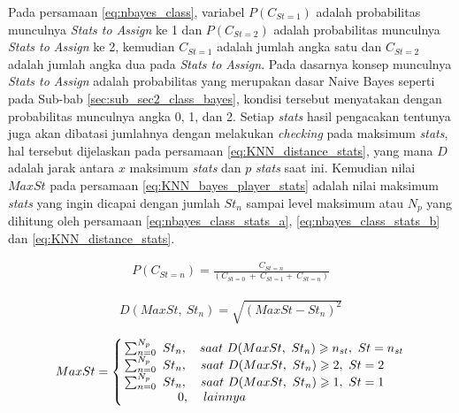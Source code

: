 Pada persamaan \ref{eq:nbayes_class}, variabel $P(C_{St = 1})$ adalah probabilitas munculnya \textit{Stats to Assign} ke 1 dan $P(C_{St = 2})$ adalah probabilitas munculnya \textit{Stats to Assign} ke 2, kemudian $C_{St = 1}$ adalah jumlah angka satu dan $C_{St = 2}$ adalah jumlah angka dua pada \textit{Stats to Assign}. Pada dasarnya konsep munculnya \textit{Stats to Assign} adalah probabilitas yang merupakan dasar Naive Bayes seperti pada Sub-bab \ref{sec:sub_sec2_class_bayes}, kondisi tersebut menyatakan dengan probabilitas munculnya angka 0, 1, dan 2. Setiap \textit{stats} hasil pengacakan tentunya juga akan dibatasi jumlahnya dengan melakukan \textit{checking} pada maksimum \textit{stats}, hal tersebut dijelaskan pada persamaan \ref{eq:KNN_distance_stats}, yang mana $D$ adalah jarak antara $x$ maksimum \textit{stats} dan $p$ \textit{stats} saat ini. Kemudian nilai $MaxSt$ pada persamaan \ref{eq:KNN_bayes_player_stats} adalah nilai maksimum \textit{stats} yang ingin dicapai dengan jumlah $St_{n}$ sampai level maksimum atau $N_{p}$ yang dihitung oleh persamaan \ref{eq:nbayes_class_stats_a}, \ref{eq:nbayes_class_stats_b} dan \ref{eq:KNN_distance_stats}.
\vspace{1ex}

\begin{equation}\label{eq:nbayes_class_stats_1}
\begin{split}
P(C_{St = n}) = \frac{C_{St = n}}{(C_{St = 0}\ +\ C_{St = 1} +\ C_{St = n})}
\end{split}
\end{equation}

\begin{equation}\label{eq:KNN_distance_stats_1}
\begin{split}
D(MaxSt,\ St_{n}) = \sqrt{(MaxSt - St_{n})^2}
\end{split}
\end{equation}

\begin{equation}\label{eq:KNN_bayes_player_stats_1}
\begin{split}
MaxSt = \left\{\begin{matrix}
\sum_{n = 0}^{N_{p}}\ St_{n}, & saat\ D(MaxSt,\ St_{n}) \geqslant n_{st},\ St = n_{st} \\
\sum_{n = 0}^{N_{p}}\ St_{n}, & \hspace{-1.5em}saat\ D(MaxSt,\ St_{n}) \geqslant 2,\ St = 2 \\
\sum_{n = 0}^{N_{p}}\ St_{n}, & \hspace{-1.5em}saat\ D(MaxSt,\ St_{n}) \geqslant 1,\ St = 1 \\
\hspace{4.5em} 0, 		  & \hspace{-12.5em} lainnya
\end{matrix}\right.
\end{split}
\end{equation}
\vspace{1ex}

